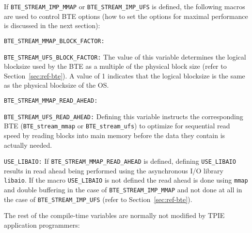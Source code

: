 \noindent
If \lstinline|BTE_STREAM_IMP_MMAP| or \lstinline|BTE_STREAM_IMP_UFS|
is defined, the following macros are used to control BTE options (how
to set the options for maximal performance is discussed in the next
section):

\begin{description}
  
\item\lstinline|BTE_STREAM_MMAP_BLOCK_FACTOR:|
\item\lstinline|BTE_STREAM_UFS_BLOCK_FACTOR:| The value of this
  variable determines the logical blocksize used by the BTE as a
  multiple of the physical block size (refer to
  Section~\ref{sec:ref-bte}). A value of 1 indicates that the logical
  blocksize is the same as the physical blocksize of the OS.

\item\lstinline|BTE_STREAM_MMAP_READ_AHEAD:| 
\item\lstinline|BTE_STREAM_UFS_READ_AHEAD:| Defining this variable
  instructs the corresponding BTE (\lstinline|BTE_stream_mmap| or
  \lstinline|BTE_stream_ufs|) to optimize for sequential read speed by
  reading blocks into main memory before the data they contain is
  actually needed.  
  
\item\lstinline|USE_LIBAIO:| If \lstinline|BTE_STREAM_MMAP_READ_AHEAD|
  is defined, defining \lstinline|USE_LIBAIO| results in read ahead
  being performed using the asynchronous I/O library
  \lstinline|libaio|. If the macro \lstinline|USE_LIBAIO| is not
  defined the read ahead is done using \lstinline|mmap| and double
  buffering in the case of \lstinline|BTE_STREAM_IMP_MMAP| and not
  done at all in the case of \lstinline|BTE_STREAM_IMP_UFS| (refer to
  Section~\ref{sec:ref-bte}).  
\end{description}

\noindent
The rest of the compile-time variables are normally not modified by
TPIE application programmers:

